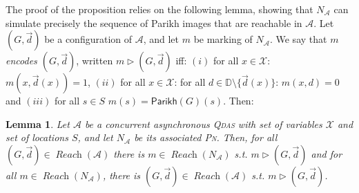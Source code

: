\documentclass[runningheads,oribibl,]{article}
\newcommand{\Aa}{\ensuremath{\mathcal{A}}\xspace}
\newcommand{\Xx}{\ensuremath{\mathcal{X}}\xspace}
\newcommand{\DD}{\ensuremath{\mathbb{D}}\xspace}
\newcommand{\pn}{\textsc{Pn}\xspace}
\newcommand{\qdas}{\textsc{Qdas}\xspace}
\DeclareMathOperator{\Reach}{\textit{Reach}}
\newcommand{\Data}{\ensuremath{\vec{d}}}
\newcommand{\Parikh}{\ensuremath{\mathsf{Parikh}}}
\newtheorem{lemma}{Lemma}{}
\begin{document}
\propfromqdastopn*

The proof of the proposition relies on the following lemma, showing
that $N_\Aa$ can simulate precisely the sequence of Parikh images that
are reachable in $\Aa$. Let $(G,\Data)$ be a configuration of $\Aa$,
and let $m$ be marking of $N_\Aa$. We say that \emph{$m$ encodes
  $(G,\Data)$}, written $m\rhd (G,\Data)$ iff: $(i)$ for all
$x\in\Xx$: $m(x,\Data(x))=1$, $(ii)$ for all $x\in\Xx$: for all
$d\in\DD\setminus\{\Data(x)\}$: $m(x,d)=0$ and $(iii)$ for all $s\in
S$ $m(s)=\Parikh(G)(s)$. Then:

\begin{lemma}\label{lemma:from-qdas-to-pn}
  Let $\Aa$ be a concurrent asynchronous \qdas with set of variables
  $\Xx$ and set of locations $S$, and let $N_\Aa$ be its associated
  \pn.  Then, for all $(G,\Data)\in\Reach(\Aa)$ there is
  $m\in\Reach(N_\Aa)$ s.t. $m\rhd (G,\Data)$ and for all
  $m\in\Reach(N_\Aa)$, there is $(G,\Data)\in\Reach(\Aa) $ s.t. $m\rhd
  (G,\Data)$.
\end{lemma}
\end{document}

